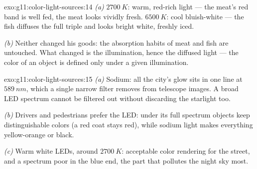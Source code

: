 \begin{solution}{exo:g11:color-light-sources:14}
\emph{(a)} $\qty{2700}{K}$: warm, red-rich light --- the meat's red band
is well fed, the meat looks vividly fresh. $\qty{6500}{K}$: cool
bluish-white --- the fish diffuses the full triple and looks bright
white, freshly iced.

\emph{(b)} Neither changed his goods: the absorption habits of meat and
fish are untouched. What changed is the illumination, hence the diffused
light --- the color of an object is defined only under a given
illumination.
\end{solution}

\begin{solution}{exo:g11:color-light-sources:15}
\emph{(a)} Sodium: all the city's glow sits in one line at
$\qty{589}{nm}$, which a single narrow filter removes from telescope
images. A broad LED spectrum cannot be filtered out without discarding
the starlight too.

\emph{(b)} Drivers and pedestrians prefer the LED: under its full
spectrum objects keep distinguishable colors (a red coat stays red),
while sodium light makes everything yellow-orange or black.

\emph{(c)} Warm white LEDs, around $\qty{2700}{K}$: acceptable color
rendering for the street, and a spectrum poor in the blue end, the part
that pollutes the night sky most.
\end{solution}


